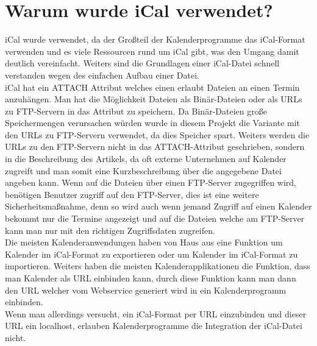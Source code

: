 \section{Warum wurde iCal verwendet?}
\label{sec:warumWurdeiCalVerwendet?}
iCal wurde verwendet, da der Großteil der Kalenderprogramme das iCal-Format verwenden und es viele Ressourcen rund um iCal gibt, was den Umgang damit deutlich vereinfacht. Weiters sind die Grundlagen einer iCal-Datei schnell verstanden wegen des einfachen Aufbau einer Datei.\\
iCal hat ein ATTACH Attribut welches einen erlaubt Dateien an einen Termin anzuhängen. Man hat die Möglichkeit Dateien als Binär-Dateien oder als URLs zu FTP-Servern in das Attribut zu speichern. Da Binär-Dateien große Speichermengen verursachen würden wurde in diesem Projekt die Variante mit den URLs zu FTP-Servern verwendet, da dies Speicher spart. Weiters werden die URLs zu den FTP-Servern nicht in das ATTACH-Attribut geschrieben, sondern in die Beschreibung des Artikels, da oft externe Unternehmen auf Kalender zugreift und man somit eine Kurzbeschreibung über die angegebene Datei angeben kann. Wenn auf die Dateien über einen FTP-Server zugegriffen wird, benötigen Benutzer zugriff auf den FTP-Server, dies ist eine weitere Sicherheitsmaßnahme, denn so wird auch wenn jemand Zugriff auf einen Kalender bekommt nur die Termine angezeigt und auf die Dateien welche am FTP-Server kann man nur mit den richtigen Zugriffsdaten zugreifen.\\
Die meisten Kalenderanwendungen haben von Haus aus eine Funktion um Kalender im iCal-Format zu exportieren oder um Kalender im iCal-Format zu importieren. Weiters haben die meisten Kalenderapplikationen die Funktion, dass man Kalender als URL einbinden kann, durch diese Funktion kann man dann den URL welcher vom Webservice generiert wird in ein Kalenderprogramm einbinden.
\\
Wenn man allerdings versucht, ein iCal-Format per URL einzubinden und dieser URL ein localhost, erlauben Kalenderprogramme die Integration der iCal-Datei nicht.


